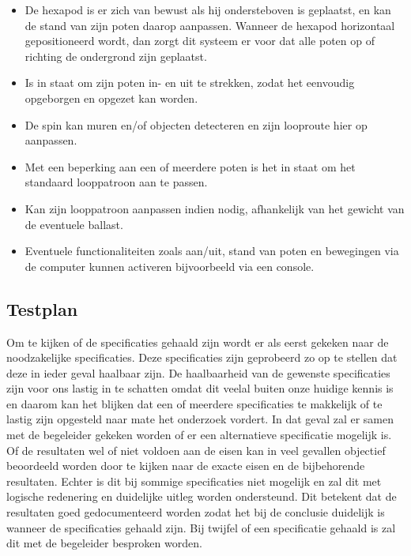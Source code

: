 \documentclass[10pt,a4paper]{article}
\begin{document}
\begin{itemize}
\setlength\itemsep{0em}
\item De hexapod is er zich van bewust als hij ondersteboven is geplaatst, en kan de stand van zijn poten daarop aanpassen. Wanneer de hexapod horizontaal gepositioneerd wordt, dan zorgt dit systeem er voor dat alle poten op of richting de ondergrond zijn geplaatst.
\item Is in staat om zijn poten in- en uit te strekken, zodat het eenvoudig opgeborgen en opgezet kan worden.
\item De spin kan muren en/of objecten detecteren en zijn looproute hier op aanpassen. 
\item Met een beperking aan een of meerdere poten is het in staat om het standaard looppatroon aan te passen.
\item Kan zijn looppatroon aanpassen indien nodig, afhankelijk van het gewicht van de eventuele ballast.
\item Eventuele functionaliteiten zoals aan/uit, stand van poten en bewegingen via de computer kunnen activeren bijvoorbeeld via een console.
\end{itemize}

\subsection{Testplan}
Om te kijken of de specificaties gehaald zijn wordt er als eerst gekeken naar de noodzakelijke specificaties. Deze specificaties zijn geprobeerd zo op te stellen dat deze in ieder geval haalbaar zijn. De haalbaarheid van de gewenste specificaties zijn voor ons lastig in te schatten omdat dit veelal buiten onze huidige kennis is en daarom kan het blijken dat een of meerdere specificaties te makkelijk of te lastig zijn opgesteld naar mate het onderzoek vordert. In dat geval zal er samen met de begeleider gekeken worden of er een alternatieve specificatie mogelijk is.
Of de resultaten wel of niet voldoen aan de eisen kan in veel gevallen objectief beoordeeld worden door te kijken naar de exacte eisen en de bijbehorende resultaten. Echter is dit bij sommige specificaties niet mogelijk en zal dit met logische redenering en duidelijke uitleg worden ondersteund.
Dit betekent dat de resultaten goed gedocumenteerd worden zodat het bij de conclusie duidelijk is wanneer de specificaties gehaald zijn. Bij twijfel of een specificatie gehaald is zal dit met de begeleider besproken worden.
\newpage
\end{document}
